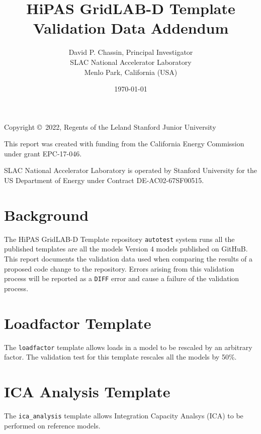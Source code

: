 \documentclass{article}
\title
{
	HiPAS GridLAB-D Template Validation Data Addendum
}
\author
{
	David P. Chassin, Principal Investigator
\\
	SLAC National Accelerator Laboratory
\\
	Menlo Park, California (USA) 
}
\date { \today }
\def\code#1{\texttt{#1}}
\begin{document}
\maketitle

{
	\center 
	
	Copyright \copyright\ 2022, Regents of the Leland Stanford Junior University

\vspace{1cm}

	This report was created with funding from the California Energy Commission under grant EPC-17-046.

\vspace{1cm}

	SLAC National Accelerator Laboratory is operated by Stanford University for the US Department of Energy
	under Contract DE-AC02-67SF00515.
}

\newpage

\tableofcontents

\newpage

\listoftables

\newpage

\section{Background}

The HiPAS GridLAB-D Template repository \code{autotest} system runs all the published templates are all the models Version 4 models published on GitHuB. This report documents the validation data used when comparing the results of a proposed code change to the repository. Errors arising from this validation process will be reported as a \code{DIFF} error and cause a failure of the validation process.

\section{Loadfactor Template}

The \code{loadfactor} template allows loads in a model to be rescaled by an arbitrary factor. The validation test for this template rescales all the models by 50\%.



\section{ICA Analysis Template}

The \code{ica\_analysis} template allows Integration Capacity Analsys (ICA) to be performed on reference models. 



\end{document}
